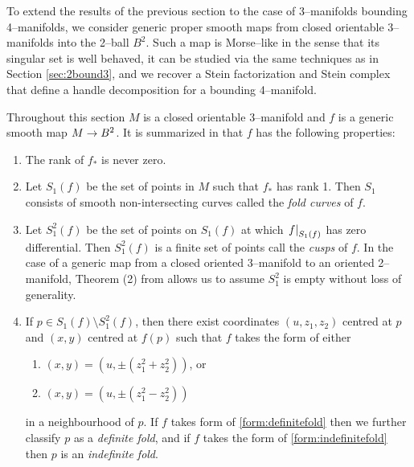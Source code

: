 \label{sec:3bound4}

%	
%
%
%
%

To extend the results of the previous section to the case of 3--manifolds bounding 4--manifolds, we consider generic proper smooth maps from closed orientable 3--manifolds into the 2--ball $B^2$.
Such a map is Morse--like in the sense that its singular set is well behaved, it can be studied via the same techniques as in Section \ref{sec:2bound3}, and we recover a Stein factorization and Stein complex that define a handle decomposition for a bounding 4--manifold.

Throughout this section $M$ is a closed orientable 3--manifold and $f$ is a generic smooth map $M\to B^2$.
It is summarized in \cite{Levine65} that $f$ has the following properties:
\begin{enumerate}
	\item
		The rank of $f_*$ is never zero.
	
	\item
		Let $S_1(f)$ be the set of points in $M$ such that $f_*$ has rank 1.
		Then $S_1$ consists of smooth non-intersecting curves called the \emph{fold curves} of $f$.
	
	\item
		Let $S_1^2(f)$ be the set of points on $S_1(f)$ at which $\left.f\right|_{S_1(f)}$ has zero differential.
		Then $S_1^2(f)$ is a finite set of points call the \emph{cusps} of $f$.
		In the case of a generic map from a closed oriented 3--manifold to an oriented 2--manifold, Theorem (2) from \cite{Levine65} allows us to assume $S_1^2$ is empty without loss of generality.
	
	\item
		If $p\in S_1(f)\setminus S_1^2(f)$, then there exist coordinates $(u,z_1,z_2)$ centred at $p$ and $(x,y)$ centred at $f(p)$ such that $f$ takes the form of either
		\begin{enumerate}
			\item \label{form:definitefold} $(x,y)=(u,\pm(z_1^2+z_2^2))$, or			
			\item \label{form:indefinitefold} $(x,y)=(u,\pm(z_1^2-z_2^2))$
		\end{enumerate}
		in a neighbourhood of $p$.
		If $f$ takes form of \ref{form:definitefold} then we further classify $p$ as a \emph{definite fold}, and if $f$ takes the form of \ref{form:indefinitefold} then $p$ is an \emph{indefinite fold}.
\end{enumerate}

